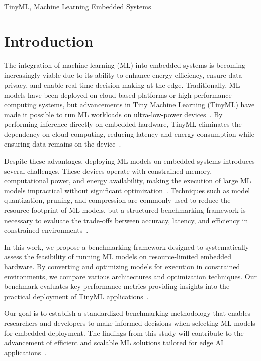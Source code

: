 \documentclass[conference]{IEEEtran}
\begin{document}
\begin{IEEEkeywords}
TinyML, Machine Learning Embedded Systems
\end{IEEEkeywords}

\section{Introduction}
The integration of machine learning (ML) into embedded systems is becoming increasingly viable due to its ability to enhance energy efficiency, ensure data privacy, and enable real-time decision-making at the edge. Traditionally, ML models have been deployed on cloud-based platforms or high-performance computing systems, but advancements in Tiny Machine Learning (TinyML) have made it possible to run ML workloads on ultra-low-power devices~\cite{tinyml2021, david2020tensorflow}. By performing inference directly on embedded hardware, TinyML eliminates the dependency on cloud computing, reducing latency and energy consumption while ensuring data remains on the device~\cite{banbury2021micronets, bouguera2018energy}.  

Despite these advantages, deploying ML models on embedded systems introduces several challenges. These devices operate with constrained memory, computational power, and energy availability, making the execution of large ML models impractical without significant optimization~\cite{chowdhery2019visual, federov2019sparse}. Techniques such as model quantization, pruning, and compression are commonly used to reduce the resource footprint of ML models, but a structured benchmarking framework is necessary to evaluate the trade-offs between accuracy, latency, and efficiency in constrained environments~\cite{koizumi2019toyadmos, he2016deep}.  

In this work, we propose a benchmarking framework designed to systematically assess the feasibility of running ML models on resource-limited embedded hardware. By converting and optimizing models for execution in constrained environments, we compare various architectures and optimization techniques. Our benchmark evaluates key performance metrics providing insights into the practical deployment of TinyML applications~\cite{warden2018speech, zhang2017hello}.  

Our goal is to establish a standardized benchmarking methodology that enables researchers and developers to make informed decisions when selecting ML models for embedded deployment. The findings from this study will contribute to the advancement of efficient and scalable ML solutions tailored for edge AI applications~\cite{purohit2019mimii, torralba2008tiny}.
\end{document}
